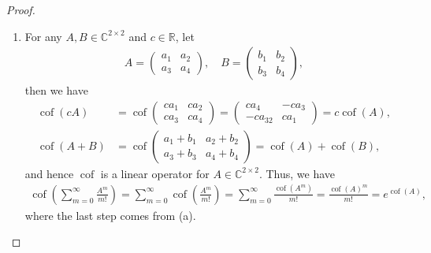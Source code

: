 \documentclass[11pt]{article}
\theoremstyle{definition}
\numberwithin{equation}{subsection}
\begin{document}
\begin{proof}
\begin{enumerate}[label=(\alph*)]
    \item For any $A, B \in \mathbb{C}^{2 \times 2}$ and $c \in \mathbb{R}$, let
    \begin{align*}
        A = \begin{pmatrix}
            a_1 & a_2 \\
            a_3 & a_4
        \end{pmatrix}, \quad B = \begin{pmatrix}
            b_1 & b_2 \\
            b_3 & b_4
        \end{pmatrix},
    \end{align*}
    then we have
    \begin{align*}
        \operatorname{cof}(cA) & = \operatorname{cof}
        \begin{pmatrix}
            c a_1 & c a_2 \\
            c a_3 & c a_4
        \end{pmatrix} = \begin{pmatrix}
            c a_4 & - c a_3 \\
            - c a_32 & c a_1
        \end{pmatrix} = c \operatorname{cof}(A), \\
        \operatorname{cof}(A + B) & = \operatorname{cof} \begin{pmatrix}
            a_1 + b_1 & a_2 + b_2 \\
            a_3 + b_3 & a_4 + b_4
        \end{pmatrix} = \operatorname{cof}(A) + \operatorname{cof}(B),
    \end{align*}
    and hence $\operatorname{cof}$ is a linear operator for $A \in \mathbb{C}^{2 \times 2}$. Thus, we have
    \begin{align*}
        \operatorname{cof} \left(\sum^\infty_{m=0} \frac{A^m}{m!} \right) = \sum^\infty_{m=0} \operatorname{cof} \left(\frac{A^m}{m!}\right) = \sum^\infty_{m=0} \frac{\operatorname{cof} \left(A^m\right)}{m!} = \frac{\operatorname{cof}\left(A\right)^m}{m!} = e^{\operatorname{cof}(A)},
    \end{align*}
    where the last step comes from (a).
\end{enumerate}
\end{proof}

\medskip
\end{document}
